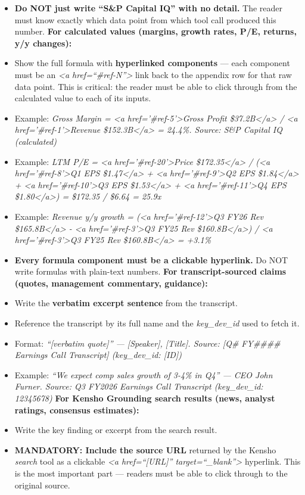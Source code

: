 \documentclass[11pt]{article}
\begin{document}
\begin{itemize}[leftmargin=*,itemsep=2pt,topsep=2pt]
\begin{itemize}[leftmargin=*,itemsep=2pt,topsep=2pt]
\begin{itemize}[leftmargin=*,itemsep=2pt,topsep=2pt]
\end{itemize}
\item {} \textbf{Do NOT just write ``S\&P Capital IQ'' with no detail.} The reader must know exactly which data point from which tool call produced this number. \textbf{For calculated values (margins, growth rates, P/E, returns, y/y changes):}
\item {} Show the full formula with \textbf{hyperlinked components} — each component must be an \emph{<a href=``\#ref-N''>} link back to the appendix row for that raw data point. This is critical: the reader must be able to click through from the calculated value to each of its inputs.
\item {} Example: \emph{Gross Margin = <a href='\#ref-5'>Gross Profit \$37.2B</a> / <a href='\#ref-1'>Revenue \$152.3B</a> = 24.4\%. Source: S\&P Capital IQ (calculated)}
\item {} Example: \emph{LTM P/E = <a href='\#ref-20'>Price \$172.35</a> / (<a href='\#ref-8'>Q1 EPS \$1.47</a> + <a href='\#ref-9'>Q2 EPS \$1.84</a> + <a href='\#ref-10'>Q3 EPS \$1.53</a> + <a href='\#ref-11'>Q4 EPS \$1.80</a>) = \$172.35 / \$6.64 = 25.9x}
\item {} Example: \emph{Revenue y/y growth = (<a href='\#ref-12'>Q3 FY26 Rev \$165.8B</a> - <a href='\#ref-3'>Q3 FY25 Rev \$160.8B</a>) / <a href='\#ref-3'>Q3 FY25 Rev \$160.8B</a> = +3.1\%}
\item {} \textbf{Every formula component must be a clickable hyperlink.} Do NOT write formulas with plain-text numbers. \textbf{For transcript-sourced claims (quotes, management commentary, guidance):}
\item {} Write the \textbf{verbatim excerpt sentence} from the transcript.
\item {} Reference the transcript by its full name and the \emph{key\_\allowbreak{}dev\_\allowbreak{}id} used to fetch it.
\item {} Format: \emph{``[verbatim quote]'' — [Speaker], [Title]. Source: [Q\# FY\#\#\#\# Earnings Call Transcript] (key\_\allowbreak{}dev\_\allowbreak{}id: [ID])}
\item {} Example: \emph{``We expect comp sales growth of 3-4\% in Q4'' — CEO John Furner. Source: Q3 FY2026 Earnings Call Transcript (key\_\allowbreak{}dev\_\allowbreak{}id: 12345678)} \textbf{For Kensho Grounding search results (news, analyst ratings, consensus estimates):}
\item {} Write the key finding or excerpt from the search result.
\item {} \textbf{MANDATORY: Include the source URL} returned by the Kensho \emph{search} tool as a clickable \emph{<a href=``[URL]'' target=``\_\allowbreak{}blank''>} hyperlink. This is the most important part — readers must be able to click through to the original source.

\end{itemize}
\end{itemize}
\end{document}
